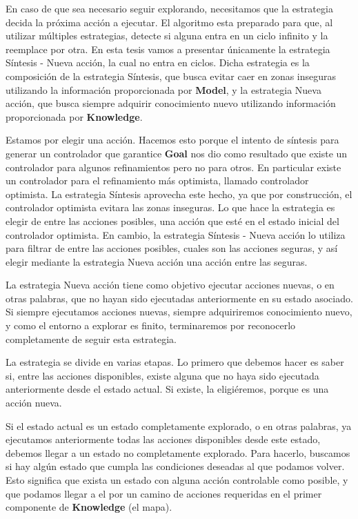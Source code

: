 En caso de que sea necesario seguir explorando, necesitamos que la estrategia decida la próxima acción a ejecutar. El algoritmo esta preparado para que,
al utilizar múltiples estrategias, detecte si alguna entra en un ciclo infinito y la reemplace por otra. En esta tesis vamos a presentar únicamente
la estrategia Síntesis - Nueva acción, la cual no entra en ciclos. Dicha estrategia es la composición de la estrategia Síntesis, que busca evitar caer
en zonas inseguras utilizando la información proporcionada por \textbf{Model}, y la estrategia Nueva acción, que busca siempre adquirir conocimiento nuevo
utilizando información proporcionada por \textbf{Knowledge}.

\vspace{\baselineskip}
Estamos por elegir una acción. Hacemos esto porque el intento de síntesis para generar un controlador que garantice \textbf{Goal} nos dio como resultado que
existe un controlador para algunos refinamientos pero no para otros. En particular existe un controlador para el refinamiento más optimista, llamado
controlador optimista. La estrategia Síntesis aprovecha este hecho, ya que por construcción, el controlador optimista evitara las zonas inseguras. Lo que
hace la estrategia es elegir de entre las acciones posibles, una acción que esté en el estado inicial del controlador optimista. En cambio, la estrategia
Síntesis - Nueva acción lo utiliza para filtrar de entre las acciones posibles, cuales son las acciones seguras, y así elegir mediante la estrategia Nueva acción
una acción entre las seguras.

\vspace{\baselineskip}
La estrategia Nueva acción tiene como objetivo ejecutar acciones nuevas, o en otras palabras, que no hayan sido ejecutadas anteriormente en su estado asociado.
Si siempre ejecutamos acciones nuevas, siempre adquiriremos conocimiento nuevo, y como el entorno a explorar es finito, terminaremos por reconocerlo completamente
de seguir esta estrategia.

\vspace{\baselineskip}
La estrategia se divide en varias etapas. Lo primero que debemos hacer es saber si, entre las acciones disponibles, existe alguna que no haya sido ejecutada
anteriormente desde el estado actual. Si existe, la eligiéremos, porque es una acción nueva.

\vspace{\baselineskip}
Si el estado actual es un estado completamente explorado, o en otras palabras, ya ejecutamos anteriormente todas las acciones disponibles desde este estado, debemos
llegar a un estado no completamente explorado. Para hacerlo, buscamos si hay algún estado que cumpla las condiciones deseadas al que podamos volver. Esto
significa que exista un estado con alguna acción controlable como posible, y que podamos llegar a el por un camino de acciones requeridas en el primer componente
de \textbf{Knowledge} (el mapa).

